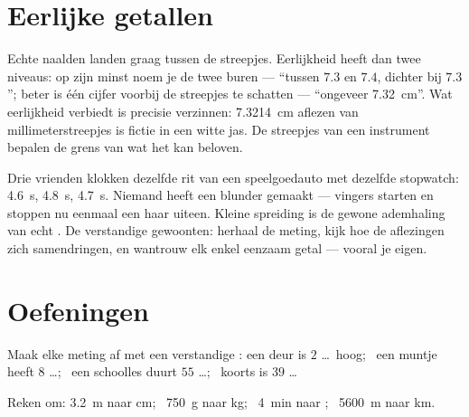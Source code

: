 \section{Eerlijke getallen}

\begin{remark}\label{rem:g6:measurement-in-science:between}
Echte naalden landen graag tussen de streepjes. Eerlijkheid heeft dan
twee niveaus: op zijn minst noem je de twee buren --- ``tussen $7.3$
en $7.4$, dichter bij $7.3$''; beter is één cijfer voorbij de
streepjes te schatten --- ``ongeveer \qty{7.32}{cm}''. Wat eerlijkheid
verbiedt is precisie verzinnen: \qty{7.3214}{cm} aflezen van
millimeterstreepjes is fictie in een witte jas. De streepjes van een
instrument bepalen de grens van wat het kan beloven.
\end{remark}

\begin{example}\label{ex:g6:measurement-in-science:repeat}
Drie vrienden klokken dezelfde rit van een speelgoedauto met dezelfde
stopwatch: \qty{4.6}{s}, \qty{4.8}{s}, \qty{4.7}{s}. Niemand heeft een
blunder gemaakt --- vingers starten en stoppen nu eenmaal een haar
uiteen. Kleine spreiding is de gewone ademhaling van echt . De
verstandige gewoonten: herhaal de meting, kijk hoe de aflezingen zich
samendringen, en wantrouw elk enkel eenzaam getal --- vooral je eigen.
\end{example}

\section{Oefeningen}

\begin{exercise}[$\star$]\label{exo:g6:measurement-in-science:1}
Maak elke meting af met een verstandige : een deur is $2$
\dots\ hoog; \ een muntje heeft  $8$ \dots; \ een schoolles duurt
$55$ \dots; \ koorts is $39$ \dots
\end{exercise}

\begin{exercise}[$\star$]\label{exo:g6:measurement-in-science:2}
Reken om: \qty{3.2}{m} naar \unit{cm}; \ \qty{750}{g} naar \unit{kg};
\ \qty{4}{min} naar ; \ \qty{5600}{m} naar \unit{km}.
\end{exercise}

